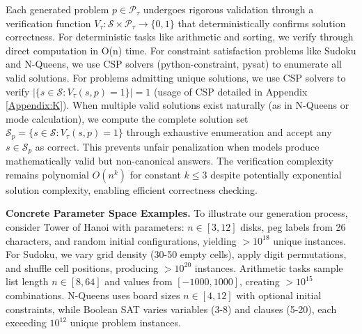 \documentclass{article} %
\theoremstyle{plain}
\theoremstyle{definition}
\newcommand{\rebuttal}[1]{{\color{RebuttalGreen}#1}}
\begin{document}
Each generated problem $p \in \mathcal{P}_\tau$ undergoes rigorous validation through a verification function $V_\tau: \mathcal{S} \times \mathcal{P}_\tau \rightarrow \{0, 1\}$ that deterministically confirms solution correctness. \rebuttal{For deterministic tasks like arithmetic and sorting, we verify through direct computation in O(n) time. For constraint satisfaction problems like Sudoku and N-Queens, we use CSP solvers (python-constraint, pysat) to enumerate all valid solutions.} For problems admitting unique solutions, we use CSP solvers \citep{dechter2003constraint} to verify $|\{s \in \mathcal{S} : V_\tau(s, p) = 1\}| = 1$ (usage of CSP detailed in Appendix \ref{Appendix:K}). When multiple valid solutions exist naturally (as in N-Queens or mode calculation), we compute the complete solution set $\mathcal{S}_p = \{s \in \mathcal{S} : V_\tau(s, p) = 1\}$ through exhaustive enumeration and accept any $s \in \mathcal{S}_p$ as correct. This prevents unfair penalization when models produce mathematically valid but non-canonical answers. The verification complexity remains polynomial $O(n^k)$ for constant $k \leq 3$ despite potentially exponential solution complexity, enabling efficient correctness checking. 

\rebuttal{\textbf{Concrete Parameter Space Examples.} To illustrate our generation process, consider Tower of Hanoi with parameters: $n \in [3,12]$ disks, peg labels from 26 characters, and random initial configurations, yielding $>10^{18}$ unique instances. For Sudoku, we vary grid density (30-50 empty cells), apply digit permutations, and shuffle cell positions, producing $>10^{20}$ instances. Arithmetic tasks sample list length $n \in [8,64]$ and values from $[-1000,1000]$, creating $>10^{15}$ combinations. N-Queens uses board sizes $n \in [4,12]$ with optional initial constraints, while Boolean SAT varies variables (3-8) and clauses (5-20), each exceeding $10^{12}$ unique problem instances.}
\end{document}

